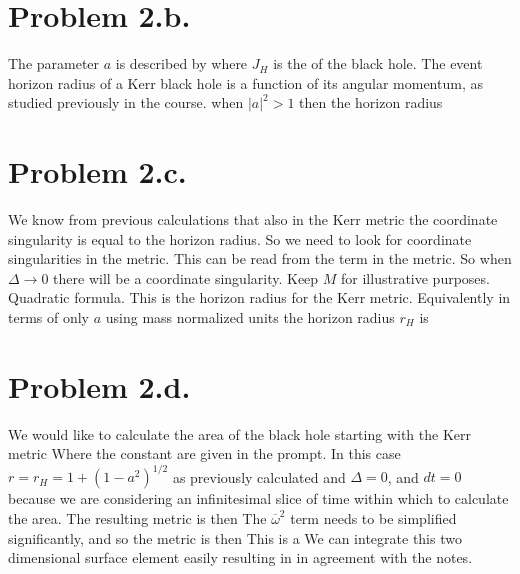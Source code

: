 \documentclass{article}
\begin{document}
\section*{Problem 2.b.}
The parameter $a$ is described by
where $J_H$ is the  of the black hole. The event horizon radius of a Kerr black hole is a function of its angular momentum, as studied previously in the course.
when $|a|^2>1$ then the horizon radius 
\section*{Problem 2.c.}
We know from previous calculations that also in the Kerr metric the coordinate singularity is equal to the horizon radius. So we need to look for coordinate singularities in the metric. This can be read from the term
in the metric. So when $\Delta\rightarrow 0$ there will be a coordinate singularity. Keep $M$ for illustrative purposes.
Quadratic formula.
This is the horizon radius for the Kerr metric. Equivalently in terms of only $a$ using mass normalized units the horizon radius $r_H$ is
\section*{Problem 2.d.}
We would like to calculate the area of the black hole starting with the Kerr metric
Where the constant are given in the prompt. In this case $r=r_H=1+(1-a^2)^{1/2}$ as previously calculated and $\Delta=0$, and $dt=0$ because we are considering an infinitesimal slice of time within which to calculate the area. The resulting metric is then
The $\overline{\omega}^2$ term needs to be simplified significantly,
and so the metric is then
This is a  We can integrate this two dimensional surface element easily resulting in 
in agreement with the notes.
\end{document}
